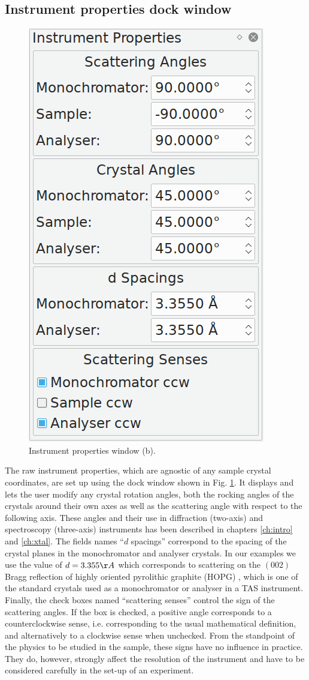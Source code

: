 \subsection{Instrument properties dock window}
\begin{minipage}{1 \textwidth}
\setlength{\intextsep}{0.25cm}
\begin{figure}
	\vspace{-0.25cm}
	\includegraphics[width = 0.25 \textwidth]{figures/gui_instrument}
	\caption[Instrument properties window]{Instrument properties window (b).
		\label{fig:gui_instr}}
\end{figure}

The raw instrument properties, which are agnostic of any sample crystal coordinates, are set up
using the dock window shown in Fig. \ref{fig:gui_instr}. It displays and lets the user modify
any crystal rotation angles, both the rocking angles of the crystals around their own axes
as well as the scattering angle with respect to the following axis. These angles and their
use in diffraction (two-axis) and spectroscopy (three-axis) instruments has been described 
in chapters \ref{ch:intro} and \ref{ch:xtal}. 
The fields names ``$d$ spacings'' correspond to the spacing of the crystal planes in the 
monochromator and analyser crystals. In our examples we use the value of $d=3.355 \AA{}$
which corresponds to scattering on the $\left(002\right)$ Bragg reflection of highly oriented
pyrolithic graphite (HOPG) \cite{TODO}, which is one of the standard crystals used as a
monochromator or analyser in a TAS instrument.
Finally, the check boxes named ``scattering senses'' control the sign of the scattering angles.
If the box is checked, a positive angle corresponds to a counterclockwise sense, i.e. corresponding
to the usual mathematical definition, and alternatively to a clockwise sense when unchecked.
From the standpoint of the physics to be studied in the sample, these signs have no influence
in practice. They do, however, strongly affect the resolution of the instrument \cite{TODO}
and have to be considered carefully in the set-up of an experiment.
\end{minipage}




